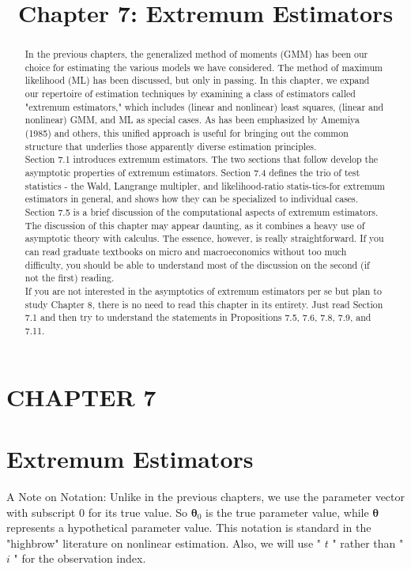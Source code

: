 \documentclass[10pt]{article}
\title{Chapter 7: Extremum Estimators}
\author{}
\date{}
\begin{document}
\maketitle

\section*{CHAPTER 7}
\section*{Extremum Estimators}
\begin{abstract}
In the previous chapters, the generalized method of moments (GMM) has been our choice for estimating the various models we have considered. The method of maximum likelihood (ML) has been discussed, but only in passing. In this chapter, we expand our repertoire of estimation techniques by examining a class of estimators called "extremum estimators," which includes (linear and nonlinear) least squares, (linear and nonlinear) GMM, and ML as special cases. As has been emphasized by Amemiya (1985) and others, this unified approach is useful for bringing out the common structure that underlies those apparently diverse estimation principles.\\
Section 7.1 introduces extremum estimators. The two sections that follow develop the asymptotic properties of extremum estimators. Section 7.4 defines the trio of test statistics - the Wald, Langrange multipler, and likelihood-ratio statis-tics-for extremum estimators in general, and shows how they can be specialized to individual cases. Section 7.5 is a brief discussion of the computational aspects of extremum estimators.\\
The discussion of this chapter may appear daunting, as it combines a heavy use of asymptotic theory with calculus. The essence, however, is really straightforward. If you can read graduate textbooks on micro and macroeconomics without too much difficulty, you should be able to understand most of the discussion on the second (if not the first) reading.\\
If you are not interested in the asymptotics of extremum estimators per se but plan to study Chapter 8, there is no need to read this chapter in its entirety. Just read Section 7.1 and then try to understand the statements in Propositions 7.5, 7.6, 7.8, 7.9, and 7.11.
\end{abstract}

A Note on Notation: Unlike in the previous chapters, we use the parameter vector with subscript 0 for its true value. So $\boldsymbol{\theta}_{0}$ is the true parameter value, while $\boldsymbol{\theta}$ represents a hypothetical parameter value. This notation is standard in the "highbrow" literature on nonlinear estimation. Also, we will use " $t$ " rather than " $i$ " for the observation index.
\end{document}
